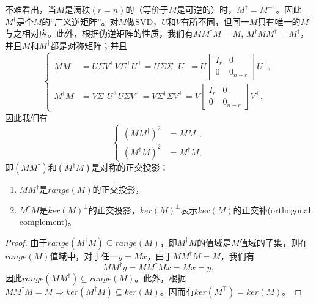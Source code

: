 \begin{subappendices}
不难看出，当$M$是满秩$(r = n)$的（等价于$M$是可逆的）时，$M^{\dagger} = M^{-1}$。因此$M^{\dagger}$是个$M$的``广义逆矩阵''。对$M$做SVD，$U$和$V$有所不同，但同一$M$只有唯一的$M^{\dagger}$与之相对应。此外，根据伪逆矩阵的性质，我们有$MM^{\dagger}M = M$, $M^{\dagger} M M^{\dagger} = M^{\dagger}$，并且$M$和$M^{\dagger}$都是对称矩阵；并且
\begin{equation*}
  \begin{cases}
    MM^{\dagger} &=  U \Sigma V^{\top} V \Sigma^{\top} U^{\top} = U
    \Sigma \Sigma^{\top} U^{\top} = U \begin{bmatrix}
    I_r & 0 \\ 0 & 0_{n-r}
  \end{bmatrix} U^{\top}, \\
  M^{\dagger} M &= V \Sigma^{\dagger} U^{\top} U \Sigma V^{\top} = V \Sigma^{\dagger} \Sigma V^{\top} = V \begin{bmatrix}
  I_r & 0 \\ 0 & 0_{n-r}
\end{bmatrix} V^{\top},
  \end{cases}
\end{equation*}
因此我们有
\begin{equation*}
  \begin{cases}
    \left(M M^{\dagger}\right)^2 &= MM^{\dagger}, \\
    \left(M^{\dagger} M \right)^2 &= M^{\dagger}M,
    \end{cases}
\end{equation*}
即$\left(M M^{\dagger}\right)$和$\left(M^{\dagger} M \right)$是对称的正交投影：
\begin{enumerate}
  \item $MM^{\dagger}$是$range(M)$的正交投影，
  \item $M^{\dagger} M$是$ker(M)^{\bot}$的正交投影，$ker(M)^{\bot}$表示$ker(M)$的正交补(orthogonal complement)。
\end{enumerate}

\begin{proof}
  由于$range (M^{\dagger} M) \subseteq range(M)$，即$M^{\dagger} M$的值域是$M$值域的子集，则在$range(M)$值域中，对于任一$y = M x$，由于$MM^{\dagger} M = M$，我们有
  \begin{equation*}
    MM^{\dagger} y = MM^{\dagger} M x= M x = y,
  \end{equation*}
  因此$range(MM^{\dagger}) \subseteq range(M)$。此外，根据$MM^{\dagger} M = M \Rightarrow ker(M^{\dagger} M) \subseteq ker(M)$。因而有$ker(M^{\top}) = ker(M)$。


\end{proof}
\end{subappendices}
